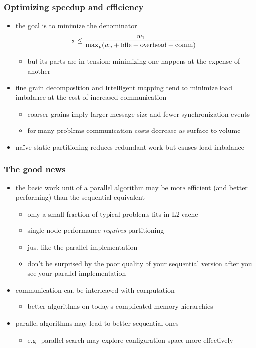 \begin{frame}[fragile]
%
  \frametitle{Optimizing speedup and efficiency}
  \begin{itemize}
%
    \item the goal is to minimize the denominator
      \[
      \sigma \leq \frac{w_{1}}{{\rm max}_{p}(w_{p} + {\rm idle} + {\rm overhead} + {\rm comm})}
      \]
      \begin{itemize}
        \item but its parts are in tension: minimizing one happens at the expense of another
      \end{itemize}
%
  \item fine grain decomposition and intelligent mapping tend to minimize load imbalance at the
    cost of increased communication
    \begin{itemize}
    \item coarser grains imply larger message size and fewer synchronization events
    \item for many problems communication costs decrease as surface to volume
    \end{itemize}
%
  \item na\"ive static partitioning reduces redundant work but causes load imbalance
%
  \end{itemize}
%
\end{frame}

\begin{frame}[fragile]
%
  \frametitle{The good news}
%
  \begin{itemize}
%
  \item the basic work unit of a parallel algorithm may be more efficient (and better
    performing) than the sequential equivalent
    \begin{itemize}
    \item only a small fraction of typical problems fits in L2 cache
    \item single node performance {\em requires} partitioning
    \item just like the parallel implementation
    \item don't be surprised by the poor quality of your sequential version after you see
      your parallel implementation
    \end{itemize}
%
  \item communication can be interleaved with computation
    \begin{itemize}
    \item better algorithms on today's complicated memory hierarchies
    \end{itemize}
%
    \item parallel algorithms may lead to better sequential ones
      \begin{itemize}
        \item e.g.~parallel search may explore configuration space more effectively
      \end{itemize}
%
  \end{itemize}
%
\end{frame}

